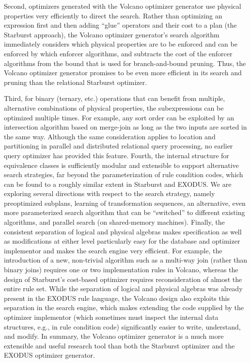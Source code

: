 \documentclass[a4paper,12pt,notitlepage,twoside,openright]{article}
\begin{document}
Second, optimizers generated with the Volcano optimizer generator use
physical properties very efficiently to direct the search. Rather than
optimizing an expression first and then adding ``glue'' operators and
their cost to a plan (the Starburst approach), the Volcano optimizer
generator's search algorithm immediately considers which physical
properties are to be enforced and can be enforced by which enforcer
algorithms, and subtracts the cost of the enforcer algorithms from the
bound that is used for branch-and-bound pruning. Thus, the Volcano
optimizer generator promises to be even more efficient in its search and
pruning than the relational Starburst optimizer.

Third, for binary (ternary, etc.) operations that can benefit from
multiple, alternative combinations of physical properties, the
subexpressions can be optimized multiple times. For example, any sort
order can be exploited by an intersection algorithm based on merge-join
as long as the two inputs are sorted in the same way. Although the same
consideration applies to location and partitioning in parallel and
distributed relational query processing, no earlier query optimizer has
provided this feature. Fourth, the internal structure for equivalence
classes is sufficiently modular and extensible to support alternative
search strategies, far beyond the parameterization of rule condition
codes, which can be found to a roughly similar extent in Starburst and
EXODUS. We are exploring several directions with respect to the search
strategy, namely preoptimized subplans, learning of transformation
sequences, an alternative, even more parameterized search algorithm that
can be ``switched'' to different existing algorithms, and parallel search
(on shared-memory machines). Finally, the consistent separation of
logical and physical algebras makes specification as well as
modifications at either level particularly easy for the database and
optimizer implementor and makes the search engine very efficient. For
example, the introduction of a new, non-trivial algorithm such as a
multi-way join (rather than binary joins) requires one or two
implementation rules in Volcano, whereas the design of Starburst's
cost-based optimizer requires reconsideration of almost the entire rule
set. While the separation of logical and physical algebras was already
present in the EXODUS rule language, the Volcano design also exploits
this separation in the search engine, which makes extending the code
supplied by the optimizer implementor (which sometimes must inspect the
internal data structures, e.g., in rule condition code) significantly
easier to write, understand, and modify. In summary, the Volcano
optimizer generator is a much more extensible and useful research tool
than both the Starburst optimizer and the EXODUS optimizer generator.
\end{document}
